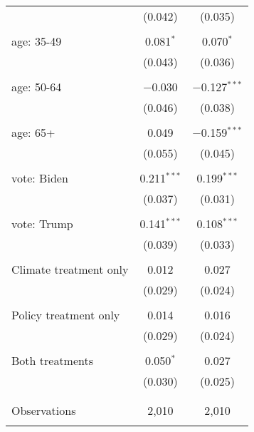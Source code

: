 \begin{tabular}{@{\extracolsep{5pt}}lcc}
  & (0.042) & (0.035) \\ 
  & & \\ 
 age: 35-49 & 0.081$^{*}$ & 0.070$^{*}$ \\ 
  & (0.043) & (0.036) \\ 
  & & \\ 
 age: 50-64 & $-$0.030 & $-$0.127$^{***}$ \\ 
  & (0.046) & (0.038) \\ 
  & & \\ 
 age: 65+ & 0.049 & $-$0.159$^{***}$ \\ 
  & (0.055) & (0.045) \\ 
  & & \\ 
 vote: Biden & 0.211$^{***}$ & 0.199$^{***}$ \\ 
  & (0.037) & (0.031) \\ 
  & & \\ 
 vote: Trump & 0.141$^{***}$ & 0.108$^{***}$ \\ 
  & (0.039) & (0.033) \\ 
  & & \\ 
 Climate treatment only & 0.012 & 0.027 \\ 
  & (0.029) & (0.024) \\ 
  & & \\ 
 Policy treatment only & 0.014 & 0.016 \\ 
  & (0.029) & (0.024) \\ 
  & & \\ 
 Both treatments & 0.050$^{*}$ & 0.027 \\ 
  & (0.030) & (0.025) \\ 
  & & \\ 
\hline \\[-1.8ex] 

Observations & 2,010 & 2,010 \\ 
\hline 
\hline \\[-1.8ex] 
\end{tabular} 